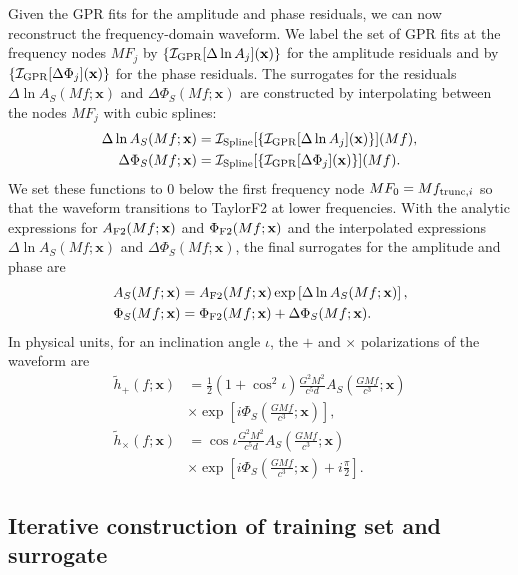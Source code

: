 \documentclass[prd,aps,letter,twocolumn,floatfix,notitlepage,nofootinbib]{revtex4-1}
\def\bx{\mathbf{x}}
\begin{document}
Given the GPR fits for the amplitude and phase residuals, we can now reconstruct the frequency-domain waveform. We label the set of GPR fits at the frequency nodes $MF_j$ by $\{\mathcal{I}_{\rm GPR}[\Delta\ln A_j](\bx)\}$ for the amplitude residuals and by $\{\mathcal{I}_{\rm GPR}[\Delta\Phi_j](\bx)\}$ for the phase residuals. The surrogates for the residuals $\Delta\ln A_S(Mf;\bx)$ and $\Delta\Phi_S(Mf;\bx)$ are constructed by interpolating between the nodes $MF_j$ with cubic splines:
\begin{align}
\Delta\ln A_S(Mf;\bx) &= \mathcal{I}_{\rm Spline}[\{\mathcal{I}_{\rm GPR}[\Delta\ln A_j](\bx)\}](Mf),\\
\Delta\Phi_S(Mf;\bx) &= \mathcal{I}_{\rm Spline}[\{\mathcal{I}_{\rm GPR}[\Delta\Phi_j](\bx)\}](Mf).
\end{align}
We set these functions to 0 below the first frequency node $MF_0 =  Mf_{{\rm trunc},i}$ so that the waveform transitions to TaylorF2 at lower frequencies. With the analytic expressions for $A_{\rm F2}(Mf;\bx)$ and $\Phi_{\rm F2}(Mf;\bx)$ and the interpolated expressions $\Delta\ln A_S(Mf;\bx)$ and $\Delta\Phi_S(Mf;\bx)$, the final surrogates for the amplitude and phase are
\begin{align}
\label{eq:amp_sur}
A_S(Mf;\bx) &= A_{\rm F2}(Mf;\bx) \exp\left[ \Delta\ln A_S(Mf;\bx) \right], \\
\label{eq:phase_sur}
\Phi_S(Mf;\bx) &= \Phi_{\rm F2}(Mf;\bx) + \Delta\Phi_S(Mf;\bx).
\end{align}
In physical units, for an inclination angle $\iota$, the $+$ and $\times$ polarizations of the waveform are 
\begin{align}
\label{eq:hplus_sur}
\tilde h_+(f; \bx) &= \frac{1}{2}(1+\cos^2\iota) \frac{G^2 M^2}{c^5 d} A_S\left(\frac{GMf}{c^3}; \bx\right) \nonumber \\
& \times \exp\left[i \Phi_S\left(\frac{GMf}{c^3}; \bx\right)\right], \\
\label{eq:hcross_sur}
\tilde h_\times(f; \bx) &= \cos\iota \frac{G^2 M^2}{c^5 d} A_S\left(\frac{GMf}{c^3}; \bx\right) \nonumber \\
& \times \exp\left[i \Phi_S\left(\frac{GMf}{c^3}; \bx\right) + i \frac{\pi}{2}\right].
\end{align}


\subsection{Iterative construction of training set and surrogate}
\label{sec:design}
\end{document}
